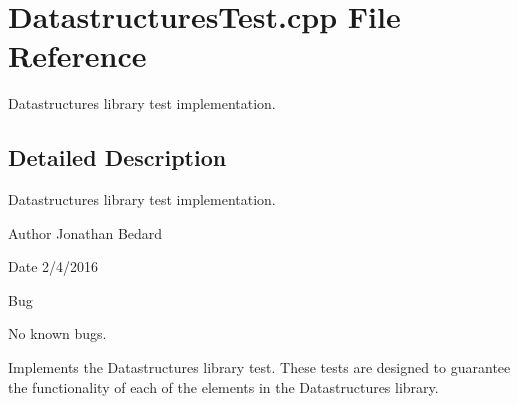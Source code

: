\section{Datastructures\+Test.\+cpp File Reference}
\label{DatastructuresTest_8cpp}


Datastructures library test implementation.  




\subsection{Detailed Description}
Datastructures library test implementation. 

\begin{DoxyAuthor}{Author}
Jonathan Bedard 
\end{DoxyAuthor}
\begin{DoxyDate}{Date}
2/4/2016 
\end{DoxyDate}
\begin{DoxyRefDesc}{Bug}
\item[{\bf Bug}]No known bugs.\end{DoxyRefDesc}


Implements the Datastructures library test. These tests are designed to guarantee the functionality of each of the elements in the Datastructures library. 